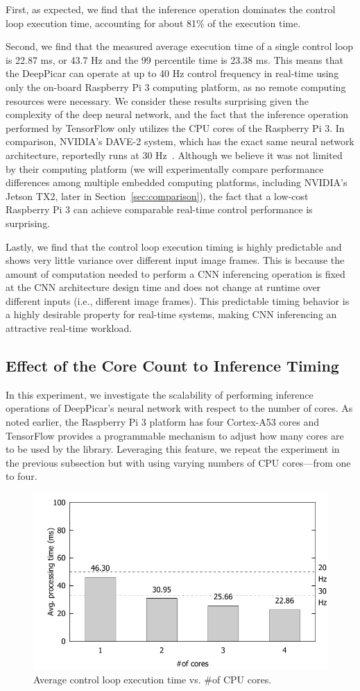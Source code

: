 First, as expected, we find that the inference operation
dominates the control loop execution time, accounting for about 81\% of
the execution time.

Second, we find that the measured average
execution time of a single control loop is 22.87 ms, or 43.7 Hz and
the 99 percentile time is 23.38 ms.
This means that the DeepPicar can operate
at up to 40 Hz control frequency in real-time using only the on-board
Raspberry Pi 3 computing platform, as no remote computing resources 
were necessary. We consider these results surprising given the complexity
of the deep neural network, and the fact that the inference operation
performed by TensorFlow only utilizes the CPU cores of the Raspberry Pi 3.
In comparison, NVIDIA's DAVE-2 system, which has the exact same neural
network architecture, reportedly runs at 30 Hz~\cite{Bojarski2016}. 
Although we believe it was not
limited by their computing platform (we will experimentally compare
performance differences among multiple embedded computing platforms,
including NVIDIA's Jetson TX2, later in
Section~\ref{sec:comparison}), the fact that a low-cost
Raspberry Pi 3 can achieve comparable real-time control performance is
surprising.

Lastly, we find that the control loop execution timing is highly
predictable and shows very little variance over different input image
frames. This is because the amount of computation needed to perform
a CNN inferencing operation is fixed at the CNN architecture design
time and does not change at runtime over different inputs (i.e.,
different image frames). This predictable timing behavior is a highly
desirable property for real-time systems, making CNN inferencing an
attractive real-time workload.

\subsection{Effect of the Core Count to Inference Timing}

In this experiment, we investigate the scalability of performing
inference operations of DeepPicar's neural network with respect to the
number of cores. As noted earlier, the Raspberry Pi 3 platform has
four Cortex-A53 cores and TensorFlow 
provides a programmable mechanism to adjust how many cores are to be
used by the library. Leveraging this feature, we repeat the
experiment in the previous subsection but with using varying
numbers of CPU cores---from one to four.

\begin{figure}[h]
  \centering
  \includegraphics[width=.45\textwidth]{figs/perf_vs_corecnt}
  \caption{Average control loop execution time vs. \#of CPU
    cores.}
  \label{fig:perf-vs-corecnt}
\end{figure}

